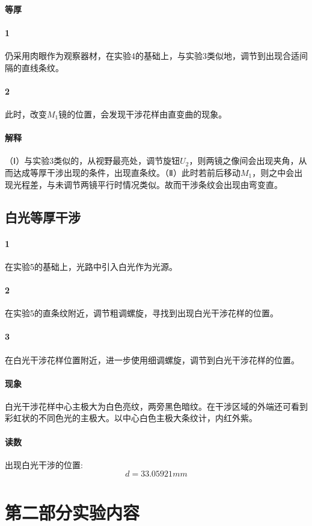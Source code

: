 \documentclass{ctexart}
\begin{document}
      \paragraph{等厚}
      \paragraph{1}仍采用肉眼作为观察器材，在实验4的基础上，与实验3类似地，调节到出现合适间隔的直线条纹。
      \paragraph{2}此时，改变$M_1$镜的位置，会发现干涉花样由直变曲的现象。
      \paragraph{解释}（Ⅰ）与实验3类似的，从视野最亮处，调节旋钮$U_2$，则两镜之像间会出现夹角，从而达成等厚干涉出现的条件，出现直条纹。（Ⅱ）此时若前后移动$M_1$，则之中会出现光程差，与未调节两镜平行时情况类似。故而干涉条纹会出现由弯变直。
      \subsection{白光等厚干涉}
      \paragraph{1}在实验5的基础上，光路中引入白光作为光源。
      \paragraph{2}在实验5的直条纹附近，调节粗调螺旋，寻找到出现白光干涉花样的位置。
      \paragraph{3}在白光干涉花样位置附近，进一步使用细调螺旋，调节到白光干涉花样的位置。
      \paragraph{现象}白光干涉花样中心主极大为白色亮纹，两旁黑色暗纹。在干涉区域的外端还可看到彩虹状的不同色光的主极大。以中心白色主极大条纹计，内红外紫。
      \paragraph{读数}出现白光干涉的位置:$$ d=33.05921mm$$
      \section{第二部分实验内容}
\end{document}
